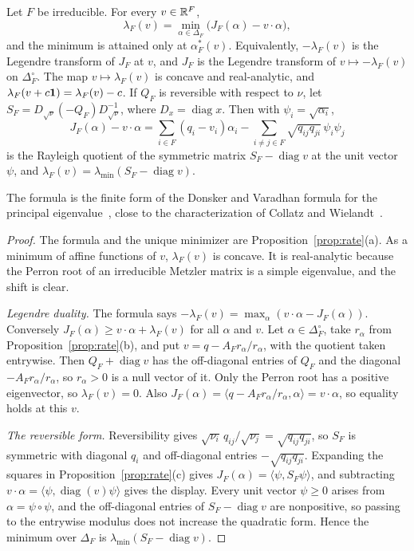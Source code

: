 \begin{proposition}\label{prop:variational}
Let $F$ be irreducible. For every $v\in\mathbb{R}^F$,
\[
 \lambda_F(v)=\min_{\alpha\in\Delta_F}\bigl(J_F(\alpha)-v\cdot\alpha\bigr),
\]
and the minimum is attained only at $\alpha^*_F(v)$. Equivalently, $-\lambda_F(v)$
is the Legendre transform of $J_F$ at $v$, and $J_F$ is the Legendre transform of
$v\mapsto-\lambda_F(v)$ on $\Delta_F^\circ$. The map $v\mapsto\lambda_F(v)$ is
concave and real-analytic, and $\lambda_F(v+c\mathbf{1})=\lambda_F(v)-c$. If $Q_F$ is
reversible with respect to $\nu$, let $S_F=D_{\sqrt\nu}(-Q_F)D_{\sqrt\nu}^{-1}$, where $D_x=\operatorname{diag}x$.
Then with $\psi_i=\sqrt{\alpha_i}$,
\[
 J_F(\alpha)-v\cdot\alpha=\sum_{i\in F}(q_i-v_i)\alpha_i-\sum_{i\ne j\in F}\sqrt{q_{ij}q_{ji}}\,\psi_i\psi_j
\]
is the Rayleigh quotient of the symmetric matrix $S_F-\operatorname{diag}v$ at the
unit vector $\psi$, and $\lambda_F(v)=\lambda_{\min}(S_F-\operatorname{diag}v)$.
\end{proposition}

The formula is the finite form of the Donsker and Varadhan formula for the
principal eigenvalue~\cite{dv1975}, close to the characterization of Collatz and
Wielandt~\cite[Ch.~2]{bermanplemmons1994}.

\begin{proof}
The formula and the unique minimizer are Proposition~\ref{prop:rate}(a). As a
minimum of affine functions of $v$, $\lambda_F(v)$ is concave. It is
real-analytic because the Perron root of an irreducible Metzler matrix is a simple
eigenvalue, and the shift is clear.

\emph{Legendre duality.} The formula says
$-\lambda_F(v)=\max_\alpha(v\cdot\alpha-J_F(\alpha))$. Conversely
$J_F(\alpha)\ge v\cdot\alpha+\lambda_F(v)$ for all $\alpha$ and $v$. Let
$\alpha\in\Delta_F^\circ$, take $r_\alpha$ from Proposition~\ref{prop:rate}(b), and
put $v=q-A_Fr_\alpha/r_\alpha$, with the quotient taken entrywise. Then $Q_F+\operatorname{diag}v$ has the
off-diagonal entries of $Q_F$ and the diagonal $-A_Fr_\alpha/r_\alpha$, so
$r_\alpha>0$ is a null vector of it. Only the Perron root has a positive
eigenvector, so $\lambda_F(v)=0$. Also $J_F(\alpha)=\langle q-A_Fr_\alpha/r_\alpha,\alpha\rangle
=v\cdot\alpha$, so equality holds at this $v$.

\emph{The reversible form.} Reversibility gives
$\sqrt{\nu_i}\,q_{ij}/\sqrt{\nu_j}=\sqrt{q_{ij}q_{ji}}$, so $S_F$ is symmetric with
diagonal $q_i$ and off-diagonal entries $-\sqrt{q_{ij}q_{ji}}$. Expanding the
squares in Proposition~\ref{prop:rate}(c) gives
$J_F(\alpha)=\langle\psi,S_F\psi\rangle$, and subtracting
$v\cdot\alpha=\langle\psi,\operatorname{diag}(v)\psi\rangle$ gives the display. Every
unit vector $\psi\ge0$ arises from $\alpha=\psi\circ\psi$, and the off-diagonal
entries of $S_F-\operatorname{diag}v$ are nonpositive, so passing to the entrywise
modulus does not increase the quadratic form. Hence the minimum over $\Delta_F$ is
$\lambda_{\min}(S_F-\operatorname{diag}v)$.
\end{proof}

